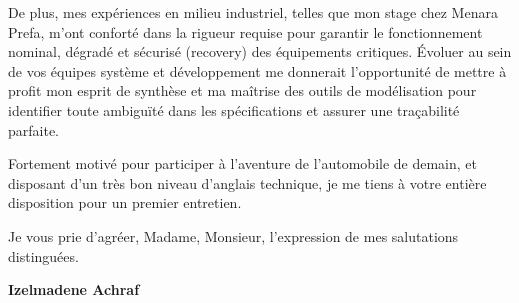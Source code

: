 \documentclass[10pt,a4paper]{../../altacv}
\begin{document}
\vspace{0.4cm}

De plus, mes expériences en milieu industriel, telles que mon stage chez Menara Prefa, m'ont conforté dans la rigueur requise pour garantir le fonctionnement nominal, dégradé et sécurisé (recovery) des équipements critiques. Évoluer au sein de vos équipes système et développement me donnerait l'opportunité de mettre à profit mon esprit de synthèse et ma maîtrise des outils de modélisation pour identifier toute ambiguïté dans les spécifications et assurer une traçabilité parfaite.

\vspace{0.4cm}

Fortement motivé pour participer à l'aventure de l'automobile de demain, et disposant d'un très bon niveau d'anglais technique, je me tiens à votre entière disposition pour un premier entretien.

\vspace{0.5cm}

Je vous prie d'agréer, Madame, Monsieur, l'expression de mes salutations distinguées.

\vfill

\begin{flushright}
  \Large\color{emphasis}\textbf{Izelmadene Achraf}
\end{flushright}
\end{document}
